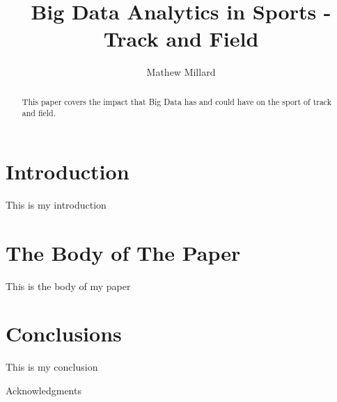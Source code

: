 \documentclass[sigconf]{acmart}
\begin{document}
\title{Big Data Analytics in Sports - Track and Field}


\author{Mathew Millard}

\renewcommand{\shortauthors}{M. Millard}

\begin{abstract}
This paper covers the impact that Big Data has and could have on the sport of track and field.
\end{abstract}



\maketitle

\section{Introduction}
This is my introduction

\section{The Body of The Paper}
This is the body of my paper

\section{Conclusions}
This is my conclusion

\begin{acks}

  Acknowledgments

\end{acks}


 
\end{document}
